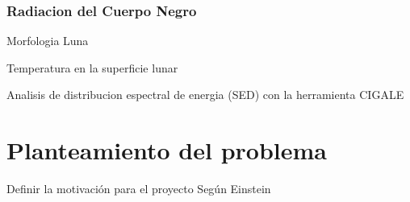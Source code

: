 \documentclass[12pt]{article}
\begin{document}
\subsubsection{Radiacion del Cuerpo Negro}
Morfologia Luna \cite{PhysicsandAstronomyMoon}

Temperatura en la superficie lunar \cite{Zhengling2024}

Analisis de distribucion espectral de energia (SED) con la herramienta CIGALE \cite{Boquien2019}

\section{Planteamiento del problema}
Definir la motivación para el proyecto Según Einstein

\printbibliography
\end{document}
